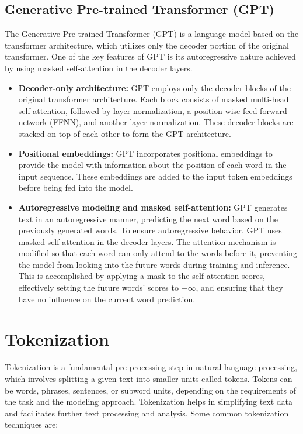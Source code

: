 \documentclass[12pt]{article}
\begin{document}
\subsection{Generative Pre-trained Transformer (GPT)}

The Generative Pre-trained Transformer (GPT) is a language model based on the transformer architecture, which utilizes only the decoder portion of the original transformer. One of the key features of GPT is its autoregressive nature achieved by using masked self-attention in the decoder layers.

\begin{itemize}
    \item \textbf{Decoder-only architecture:} GPT employs only the decoder blocks of the original transformer architecture. Each block consists of masked multi-head self-attention, followed by layer normalization, a position-wise feed-forward network (FFNN), and another layer normalization. These decoder blocks are stacked on top of each other to form the GPT architecture.
    
    \item \textbf{Positional embeddings:} GPT incorporates positional embeddings to provide the model with information about the position of each word in the input sequence. These embeddings are added to the input token embeddings before being fed into the model.
    
    \item \textbf{Autoregressive modeling and masked self-attention:} GPT generates text in an autoregressive manner, predicting the next word based on the previously generated words. To ensure autoregressive behavior, GPT uses masked self-attention in the decoder layers. The attention mechanism is modified so that each word can only attend to the words before it, preventing the model from looking into the future words during training and inference. This is accomplished by applying a mask to the self-attention scores, effectively setting the future words' scores to $-\infty$, and ensuring that they have no influence on the current word prediction.
\end{itemize}


\section{Tokenization}

Tokenization is a fundamental pre-processing step in natural language processing, which involves splitting a given text into smaller units called tokens. Tokens can be words, phrases, sentences, or subword units, depending on the requirements of the task and the modeling approach. Tokenization helps in simplifying text data and facilitates further text processing and analysis. Some common tokenization techniques are:
\end{document}
